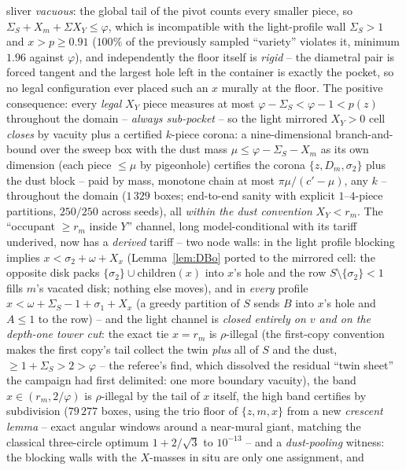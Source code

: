 \documentclass[11pt]{article}
\theoremstyle{definition}
\begin{document}
sliver \emph{vacuous}: the global tail of the pivot counts every
smaller piece, so $\Sigma_S+X_m+\Sigma X_Y\le\varphi$, which is
incompatible with the light-profile wall $\Sigma_S>1$ and
$x>p\ge0.91$ ($100\%$ of the previously sampled ``variety''
violates it, minimum $1.96$ against $\varphi$), and independently
the floor itself is \emph{rigid} -- the diametral pair is forced
tangent and the largest hole left in the container is exactly the
pocket, so no legal configuration ever placed such an $x$ murally
at the floor. The positive consequence: every \emph{legal} $X_Y$
piece measures at most $\varphi-\Sigma_S<\varphi-1<p(z)$
throughout the domain -- \emph{always sub-pocket} -- so the
light mirrored $X_Y>0$ cell \emph{closes} by vacuity plus a
certified $k$-piece corona: a nine-dimensional
branch-and-bound over the sweep box with the dust mass
$\mu\le\varphi-\Sigma_S-X_m$ as its own dimension (each piece
$\le\mu$ by pigeonhole) certifies the corona
$\{z,D_m,\sigma_2\}$ plus the dust block -- paid by mass, monotone
chain at most $\pi\mu/(c'-\mu)$, any $k$ -- throughout the domain
($1\,329$ boxes; end-to-end sanity with explicit $1$--$4$-piece
partitions, $250/250$ across seeds), all \emph{within the dust
convention} $X_Y<r_m$. The ``occupant $\ge r_m$ inside $Y$''
channel, long model-conditional with its tariff underived, now
has a \emph{derived} tariff -- two node walls: in the light
profile blocking implies $x<\sigma_2+\omega+X_x$
(Lemma~\ref{lem:DBo} ported to the mirrored cell: the opposite
disk packs $\{\sigma_2\}\cup\mathrm{children}(x)$ into $x$'s
hole and the row $S\setminus\{\sigma_2\}<1$ fills $m$'s vacated
disk; nothing else moves), and in \emph{every} profile
$x<\omega+\Sigma_S-1+\sigma_1+X_x$ (a greedy partition of $S$
sends $B$ into $x$'s hole and $A\le1$ to the row) -- and the
light channel is \emph{closed entirely on $v$ and on the depth-one
tower cut}: the exact tie $x=r_m$
is $\rho$-illegal (the first-copy convention makes the first
copy's tail collect the twin \emph{plus} all of $S$ and the
dust, $\ge1+\Sigma_S>2>\varphi$ -- the referee's find, which
dissolved the residual ``twin sheet'' the campaign had first
delimited: one more boundary vacuity), the band
$x\in(r_m,2/\varphi)$ is $\rho$-illegal by the tail of $x$
itself, the high band certifies by subdivision ($79\,277$ boxes,
using the trio floor of $\{z,m,x\}$ from a new \emph{crescent
lemma} -- exact angular windows around a near-mural giant,
matching the classical three-circle optimum $1+2/\sqrt3$ to
$10^{-13}$ -- and a \emph{dust-pooling} witness: the blocking
walls with the $X$-masses in situ are only one assignment, and
\end{document}
